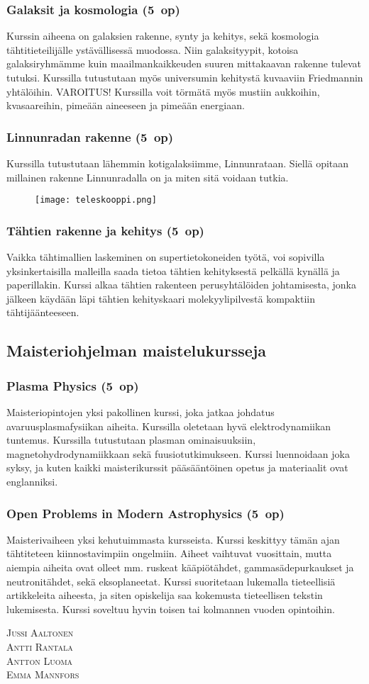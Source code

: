 \documentclass[../ala_hataile.tex]{subfiles}
\begin{document}
\subsubsection*{Galaksit ja kosmologia (5~op)}
Kurssin aiheena on galaksien rakenne,
synty ja kehitys, sekä kosmologia tähtitieteilijälle
ystävällisessä muodossa. Niin galaksityypit,
kotoisa galaksiryhmämme kuin
maailmankaikkeuden suuren mittakaavan
rakenne tulevat tutuksi. Kurssilla tutustutaan
myös universumin kehitystä kuvaaviin
Friedmannin yhtälöihin. VAROITUS!
Kurssilla voit törmätä myös mustiin aukkoihin,
kvasaareihin, pimeään aineeseen ja
pimeään energiaan.
\subsubsection*{Linnunradan rakenne (5~op)}
Kurssilla tutustutaan lähemmin kotigalaksiimme,
Linnunrataan. Siellä opitaan
millainen rakenne Linnunradalla on ja miten
sitä voidaan tutkia.

\begin{figure}
	\texttt{[image: teleskooppi.png]}
\end{figure}
\subsubsection*{Tähtien rakenne ja kehitys (5~op)}
Vaikka tähtimallien laskeminen on supertietokoneiden
työtä, voi sopivilla yksinkertaisilla
malleilla saada tietoa tähtien kehityksestä
pelkällä kynällä ja paperillakin.
Kurssi alkaa tähtien rakenteen perusyhtälöiden
johtamisesta, jonka jälkeen käydään
läpi tähtien kehityskaari molekyylipilvestä
kompaktiin tähtijäänteeseen.

\subsection*{Maisteriohjelman maistelukursseja}
\subsubsection*{Plasma Physics (5~op)}
Maisteriopintojen yksi pakollinen kurssi, joka jatkaa johdatus avaruusplasmafysiikan aiheita. Kurssilla oletetaan hyvä elektrodynamiikan tuntemus. Kurssilla tutustutaan plasman ominaisuuksiin, magnetohydrodynamiikkaan sekä fuusiotutkimukseen. Kurssi luennoidaan joka syksy, ja kuten kaikki maisterikurssit pääsääntöinen opetus ja materiaalit ovat englanniksi. 
\subsubsection*{Open Problems in Modern Astrophysics (5~op)}
Maisterivaiheen yksi kehutuimmasta kursseista. Kurssi keskittyy tämän ajan tähtiteteen kiinnostavimpiin ongelmiin. Aiheet vaihtuvat vuosittain, mutta aiempia aiheita ovat olleet mm. ruskeat kääpiötähdet, gamma\-säde\-purkaukset ja neutronitähdet, sekä eksoplaneetat. Kurssi suoritetaan lukemalla tieteellisiä artikkeleita aiheesta, ja siten opiskelija saa kokemusta tieteellisen tekstin lukemisesta. Kurssi soveltuu hyvin toisen tai kolmannen vuoden opintoihin.

\vspace{0.5cm}
\noindent
\textsc{Jussi Aaltonen}\\
\textsc{Antti Rantala}\\
\textsc{Antton Luoma}\\
\textsc{Emma Mannfors}
\end{document}
